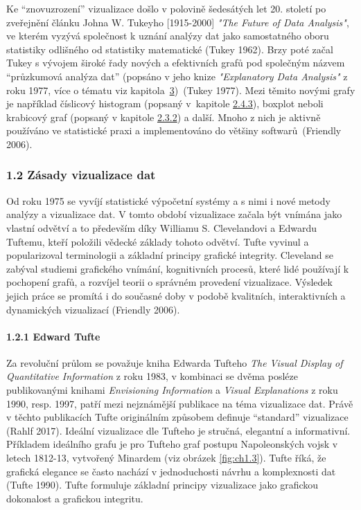 \documentclass[12pt,]{article}
\let\oldparagraph\paragraph
\renewcommand{\paragraph}[1]{\oldparagraph{#1}\mbox{}}
\begin{document}
\newpage

\qquad Ke \enquote{znovuzrození} vizualizace došlo v polovině šedesátých
let 20. století po zveřejnění článku Johna W. Tukeyho {[}1915-2000{]}
\textit{"The Future of Data Analysis"}, ve kterém vyzývá společnost k
uznání analýzy dat jako samostatného oboru statistiky odlišného od
statistiky matematické (Tukey 1962). Brzy poté začal Tukey s vývojem
široké řady nových a efektivních grafů pod společným názvem
\enquote{průzkumová analýza dat} (popsáno v jeho knize
\textit{"Explanatory Data Analysis"} z roku 1977, více o tématu viz
kapitola~\protect\hyperlink{EDA}{3})~(Tukey 1977). Mezi těmito novými
grafy je například číslicový histogram (popsaný v~kapitole
\protect\hyperlink{stem-and-leaf}{2.4.3}), boxplot neboli krabicový graf
(popsaný v kapitole \protect\hyperlink{boxplot}{2.3.2}) a další. Mnoho z
nich je aktivně používáno ve statistické praxi a implementováno do
většiny softwarů~(Friendly 2006).

\subsubsection{1.2 Zásady vizualizace dat}\label{zasady-vizualizace-dat}

\qquad Od roku 1975 se vyvíjí statistické výpočetní systémy a s nimi i
nové metody analýzy a vizualizace dat. V tomto období vizualizace začala
být vnímána jako vlastní odvětví a to především díky Williamu S.
Clevelandovi a Edwardu Tuftemu, kteří položili vědecké základy tohoto
odvětví. Tufte vyvinul a popularizoval terminologii a základní principy
grafické integrity. Cleveland se zabýval studiemi grafického vnímání,
kognitivních procesů, které lidé používají k pochopení grafů, a rozvíjel
teorii o správném provedení vizualizace. Výsledek jejich práce se
promítá i do současné doby v podobě kvalitních, interaktivních a
dynamických vizualizací (Friendly 2006).

\hypertarget{tufte}{\paragraph{1.2.1 Edward Tufte}\label{tufte}}

\qquad Za revoluční průlom se považuje kniha Edwarda Tufteho \emph{The
Visual Display of Quantitative Information} z roku 1983, v kombinaci se
dvěma posléze publikovanými knihami \emph{Envisioning Information} a
\emph{Visual Explanations} z roku 1990, resp. 1997, patří mezi
nejznámější publikace na téma vizualizace dat. Právě v těchto
publikacích Tufte originálním způsobem definuje \enquote{standard}
vizualizace (Rahlf 2017). Ideální vizualizace dle Tufteho je stručná,
elegantní a informativní. Příkladem ideálního grafu je pro Tufteho graf
postupu Napoleonských vojsk v letech 1812-13, vytvořený Minardem (viz
obrázek \ref{fig:ch1.3}). Tufte říká, že grafická elegance se často
nachází v jednoduchosti návrhu a komplexnosti dat (Tufte 1990). Tufte
formuluje základní principy vizualizace jako grafickou dokonalost a
grafickou integritu.
\end{document}
